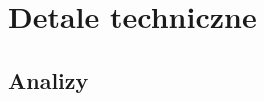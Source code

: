 \chapter{Detale techniczne}\label{chapter:experimental}


\section{Analizy}\label{experimental:analyses}

